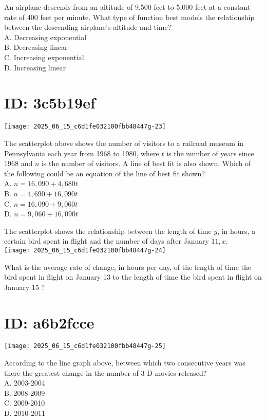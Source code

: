An airplane descends from an altitude of 9,500 feet to 5,000 feet at a constant rate of 400 feet per minute. What type of function best models the relationship between the descending airplane's altitude and time?\\
A. Decreasing exponential\\
B. Decreasing linear\\
C. Increasing exponential\\
D. Increasing linear

\section*{ID: 3c5b19ef}
\begin{center}
\texttt{[image: 2025\_06\_15\_c6d1fe032100fbb48447g-23]}
\end{center}

The scatterplot above shows the number of visitors to a railroad museum in Pennsylvania each year from 1968 to 1980, where $t$ is the number of years since 1968 and $n$ is the number of visitors. A line of best fit is also shown. Which of the following could be an equation of the line of best fit shown?\\
A. $n=16,090+4,680 t$\\
B. $n=4,690+16,090 t$\\
C. $n=16,090+9,060 t$\\
D. $n=9,060+16,090 t$

The scatterplot shows the relationship between the length of time $y$, in hours, a certain bird spent in flight and the number of days after January $11, x$.\\
\texttt{[image: 2025\_06\_15\_c6d1fe032100fbb48447g-24]}

What is the average rate of change, in hours per day, of the length of time the bird spent in flight on January 13 to the length of time the bird spent in flight on January 15 ?

\section*{ID: a6b2fcce}
\begin{center}
\texttt{[image: 2025\_06\_15\_c6d1fe032100fbb48447g-25]}
\end{center}

According to the line graph above, between which two consecutive years was there the greatest change in the number of 3-D movies released?\\
A. 2003-2004\\
B. 2008-2009\\
C. 2009-2010\\
D. 2010-2011

